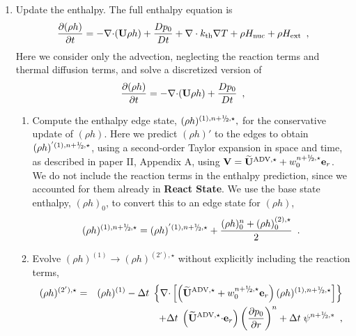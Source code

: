 \begin{description}
\begin{enumerate}
\item Update the enthalpy.  The full enthalpy equation is 
  \begin{equation}
  \frac{\partial (\rho h)}{\partial t}  = - \mathbf{\nabla} \mathbf{\cdot} ({\bf U} \rho h)
+ \frac{Dp_0}{Dt} + \nabla\cdot k_{\rm th}\nabla T + \rho {H_{\rm nuc}} + \rho {H_{\rm ext}} 
\enskip , \label{eq:rhohupd} 
  \end{equation}
Here we consider only the advection, neglecting the reaction terms and thermal diffusion terms,
and solve a discretized version of
  \begin{equation}
  \frac{\partial (\rho h)}{\partial t}  = - \mathbf{\nabla} \mathbf{\cdot} ({\bf U} \rho h)
+ \frac{Dp_0}{Dt} 
\enskip , \label{eq:rhohupdadv} 
  \end{equation}

  \begin{enumerate}
  \renewcommand{\labelenumii}{{\bf \roman{enumii}}.}

  \item Compute the enthalpy edge state, $(\rho h)^{(1),\nph,\star},$
    for the conservative update of $(\rho h).$  Here we predict $(\rho
    h)'$ to the edges to obtain $(\rho h)^{'(1),\nph,\star}$, 
    using a second-order Taylor expansion in space
    and time, as described in paper II, Appendix A, using $\Vb =
    \uadvone+w_0^{\nph,\star} \er$.  We do not include the reaction
    terms in the enthalpy prediction, since we accounted for them
    already in {\bf React State}.  We use the base state enthalpy,
    $(\rho h)_0$, to convert this to an edge state for $(\rho h)$,
\begin{equation}
(\rho h)^{(1),\nph,\star} = 
(\rho h)^{'(1),\nph,\star} + \frac{(\rho h)_0^n + (\rho h)_0^{(2),\star}}{2}
\enskip .
\end{equation}

  \item Evolve $(\rho h)^{(1)} \rightarrow (\rho h)^{(2'),\star}$ without
  explicitly including the reaction terms,
  \begin{eqnarray}
  (\rho h)^{(2'),\star} &=& (\rho h)^{(1)} - \dt \; \left\{ \nablab
      \cdotb \left[ \left(\uadvone+w_0^{\nph,\star} \er\right) (\rho
      h)^{(1),\nph,\star} \right] \right\} \nonumber \\ && + \dt \;
    \left(\uadvone \cdotb \er\right) \left(\frac{\partial
      p_0}{\partial r} \right)^{n} + \dt \; \psi^{\nph,*} \enskip ,
  \end{eqnarray}
  \end{enumerate}


\end{enumerate}
\end{description}
